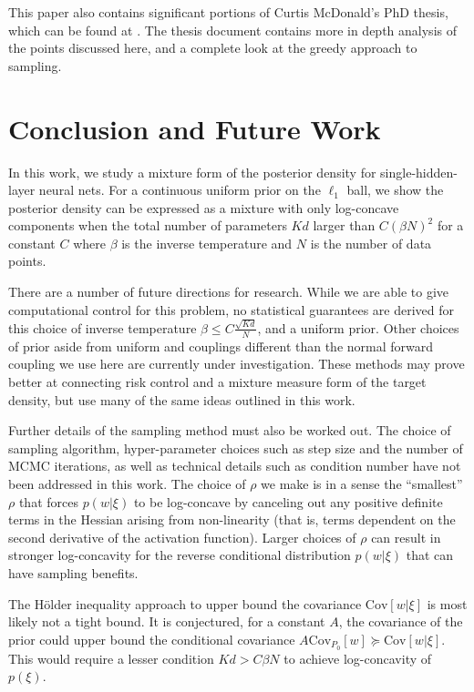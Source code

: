 \documentclass{article}
\numberwithin{equation}{section}
\theoremstyle{Lemma}
\theoremstyle{Corollary}
\theoremstyle{Theorem}
\theoremstyle{Remark}
\begin{document}
This paper also contains significant portions of Curtis McDonald's PhD thesis, which can be found at \cite{mcdonald2025computation_thesis}. The thesis document contains more in depth analysis of the points discussed here, and a complete look at the greedy approach to sampling.


\section{Conclusion and Future Work}\label{conclusions}

In this work, we study a mixture form of the posterior density for single-hidden-layer neural nets. For a continuous uniform prior on the $\ell_{1}$ ball, we show the posterior density can be expressed as a mixture with only log-concave components when the total number of parameters $Kd$ larger than $C(\beta N)^{2}$ for a constant $C$ where $\beta$ is the inverse temperature and $N$ is the number of data points. 

There are a number of future directions for research. While we are able to give computational control for this problem, no statistical guarantees are derived for this choice of inverse temperature $\beta \leq C \frac{\sqrt{Kd}}{N}$, and a uniform prior. Other choices of prior aside from uniform and couplings different than the normal forward coupling we use here are currently under investigation. These methods may prove better at connecting risk control and a mixture measure form of the target density, but use many of the same ideas outlined in this work.

Further details of the sampling method must also be worked out. The choice of sampling algorithm, hyper-parameter choices such as step size and the number of MCMC iterations, as well as technical details such as condition number have not been addressed in this work. The choice of $\rho$ we make is in a sense the ``smallest'' $\rho$ that forces $p(w|\xi)$ to be log-concave by canceling out any positive definite terms in the Hessian arising from non-linearity (that is, terms dependent on the second derivative of the activation function). Larger choices of $\rho$ can result in stronger log-concavity for the reverse conditional distribution $p(w|\xi)$ that can have sampling benefits.

The H{\"o}lder inequality approach to upper bound the covariance $\text{Cov}[w|\xi]$ is most likely not a tight bound. It is conjectured, for a constant $A$, the covariance of the prior could upper bound the conditional covariance $A \text{Cov}_{P_{0}}[w] \succeq \text{Cov}[w|\xi]$. This would require a lesser condition $Kd> C \beta N$ to achieve log-concavity of $p(\xi)$.
\end{document}
